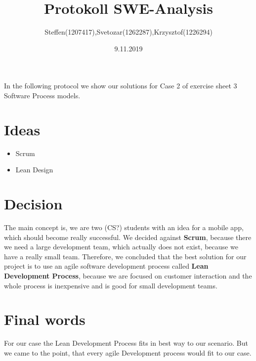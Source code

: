 \documentclass[10pt,a4paper]{article}
\author{Steffen(1207417),Svetozar(1262287),Krzysztof(1226294)}
\title{Protokoll SWE-Analysis}
\date{9.11.2019}
\begin{document}
\maketitle
\newpage
\begin{flushleft}
\large{
In the following protocol we show our solutions for Case 2 of exercise sheet 3 Software Process models.}
\end{flushleft}

\newpage
\section{Ideas}
\begin{itemize}
\item Scrum
\item Lean Design
\end{itemize}

\section{Decision}
The main concept is, we are two (CS?) students with an idea for a mobile app, which should become really successful. \newline
\newline
We decided against \normalsize{\textbf{Scrum}}, because there we need a large development team, which actually does not exist, because we have a really small team.\newline
\newline
Therefore, we concluded that the best solution for our project is to use an agile software development process called \normalsize{\textbf{Lean Development Process}}, because we are focused on customer interaction and the whole process is inexpensive and is good for small development teams.\newline
\section{Final words}
For our case the Lean Development Process fits in best way to our scenario. But we came to the point, that every agile Development process would fit to our case.
\end{document}
